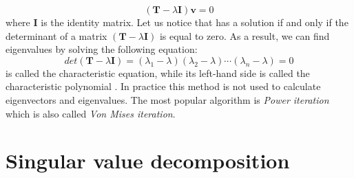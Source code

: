 \begin{appendices}
\begin{equation}\label{eq:eigen2}
    (\boldsymbol{T}-\lambda{\boldsymbol{I}})\boldsymbol{v}=0
\end{equation}
where $\boldsymbol{I}$ is the identity matrix. Let us notice that  has a solution if and only if the determinant of a matrix $(\boldsymbol{T}-\lambda{\boldsymbol{I}})$ is equal to zero. As a result, we can find eigenvalues by solving the following equation:
\begin{equation}\label{eq:eigen3}
    det(\boldsymbol{T}-\lambda{\boldsymbol{I}}) = (\lambda_1-\lambda)(\lambda_2-\lambda)\cdots(\lambda_n-\lambda) = 0
\end{equation}
 is called the characteristic equation, while its left-hand side is called the characteristic polynomial \citep{Banerjee}. In practice this method is not used to calculate eigenvectors and eigenvalues. The most popular algorithm is \textit{Power iteration} which is also called \textit{Von Mises iteration}.


\newpage
\section{Singular value decomposition}
\label{app:svd}


\end{appendices}
